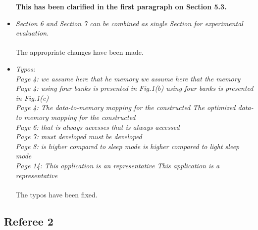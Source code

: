 \documentclass[12pt,a4paper,notitlepage]{article}
\begin{document}
\begin{itemize}
\textbf{This has been clarified in the first paragraph on Section 5.3.}

\item \textit{Section 6 and Section 7 can be combined as single Section for experimental evaluation.}
\\
\\
The appropriate changes have been made.

\item 
\textit{Typos: \\ 
Page 4: we assume here that he memory \textrightarrow we assume here that the memory\\ 
Page 4: using four banks is presented in Fig.1(b) \textrightarrow using four banks is presented in Fig.1(c) \\ 
Page 4: The data-to-memory mapping for the constructed \textrightarrow The optimized data-to memory mapping for the constructed \\ 
Page 6: that is always accesses \textrightarrow that is always accessed \\ 
Page 7: must developed \textrightarrow must be developed \\ 
Page 8: is higher compared to sleep mode \textrightarrow is higher compared to light sleep mode \\ Page 14: This application is an representative \textrightarrow This application is a representative}
\\
\\
The typos have been fixed.

\end{itemize}

\subsection*{Referee 2}
\end{document}
